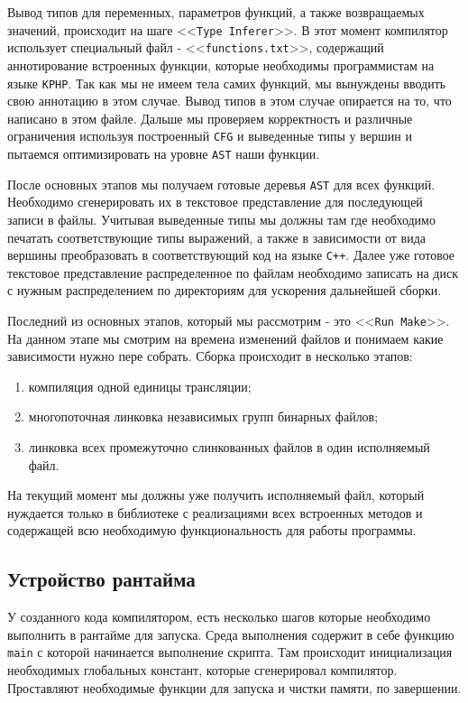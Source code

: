 Вывод типов для переменных, параметров функций, а также возвращаемых значений, происходит на шаге <<\verb|Type Inferer|>>.
В этот момент компилятор использует специальный файл - <<\verb|functions.txt|>>, содержащий аннотирование встроенных функции, которые необходимы программистам на языке \verb|KPHP|.
Так как мы не имеем тела самих функций, мы вынуждены вводить свою аннотацию в этом случае.
Вывод типов в этом случае опирается на то, что написано в этом файле.
Дальше мы проверяем корректность и различные ограничения используя построенный \verb|CFG| и выведенные типы у вершин и пытаемся оптимизировать на уровне \verb|AST| наши функции.

После основных этапов мы получаем готовые деревья \verb|AST| для всех функций.
Необходимо сгенерировать их в текстовое представление для последующей записи в файлы.
Учитывая выведенные типы мы должны там где необходимо печатать соответствующие типы выражений, а также в зависимости от вида вершины преобразовать в соответствующий код на языке \verb|C++|.
Далее уже готовое текстовое представление распределенное по файлам необходимо записать на диск с нужным распределением по директориям для ускорения дальнейшей сборки.

Последний из основных этапов, который мы рассмотрим - это <<\verb|Run Make|>>.
На данном этапе мы смотрим на времена изменений файлов и понимаем какие зависимости нужно пере собрать.
Сборка происходит в несколько этапов:
\begin{enumerate}
  \item компиляция одной единицы трансляции;
  \item многопоточная линковка независимых групп бинарных файлов;
  \item линковка всех промежуточно слинкованных файлов в один исполняемый файл.
\end{enumerate}

На текущий момент мы должны уже получить исполняемый файл, который нуждается только в библиотеке с реализациями всех встроенных методов и содержащей всю необходимую функциональность для работы программы.

\subsection{Устройство рантайма}
\label{sec2:runtime_principle}
У созданного кода компилятором, есть несколько шагов которые необходимо выполнить в рантайме для запуска.
Среда выполнения содержит в себе функцию \verb|main| с которой начинается выполнение скрипта.
Там происходит инициализация необходимых глобальных констант, которые сгенерировал компилятор.
Проставляют необходимые функции для запуска и чистки памяти, по завершении.

